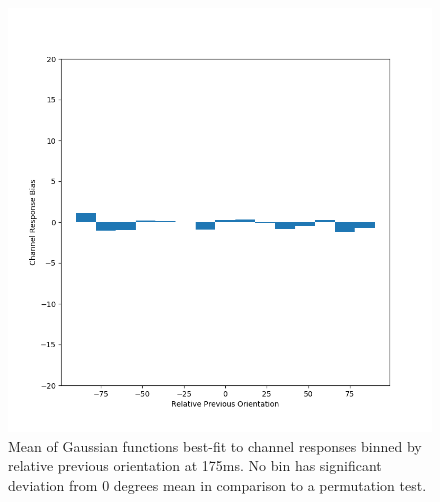 \documentclass[../main.tex]{subfiles}
\begin{document}
\begin{figure}
    \centering
    \includegraphics[scale=0.7]{figures/results/sd_all_t7_v2.png}
    \caption{Mean of Gaussian functions best-fit to channel responses binned by relative previous orientation at 175ms. No bin has significant deviation from 0 degrees mean in comparison to a permutation test.}
    \label{sd_all_v2_t7}
\end{figure}
\end{document}
